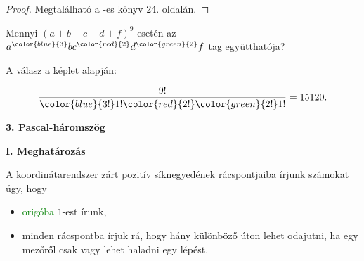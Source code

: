 \begin{proof}
Megtalálható a \cite{a2}-es könyv 24. oldalán. 
\end{proof}
\begin{problem}
Mennyi $(a+b+c+d+f)^{9}$ esetén az $a^{{\color{blue}{3}}}bc^{{\color{red}{2}}}d^{{\color{green}{2}}}f$
tag együtthatója?
\end{problem}
\begin{solution}
A válasz a képlet alapján:

\[
\frac{9!}{{\color{blue}{3!}}1!{\color{red}{2!}}{\color{green}{2!}}1!}=15120.
\]
\end{solution}

\textbf{3. Pascal-háromszög}

\vspace{0.3cm}

\textbf{I. Meghatározás}

A koordinátarendszer \textcolor{ccqqqq}{zárt pozitív síknegyedének}
rácspontjaiba írjunk számokat úgy, hogy 
\begin{itemize}
\item \textcolor{green}{origóba} $1$-est írunk, 
\item minden rácspontba írjuk rá, hogy hány különböző úton lehet odajutni,
ha egy mezőről csak {\color{red}{jobbra}} vagy {\color{blue}{felfele}}
lehet haladni egy lépést. 
\end{itemize}
\begin{center}
\par\end{center}

